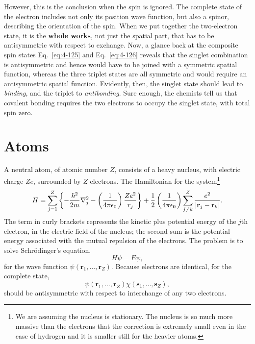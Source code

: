 However, this is the conclusion when the spin is ignored.
The complete state of the electron includes not only its position wave function, but also a spinor, describing the orientation of the spin.
When we put together the two-electron state, it is the \textbf{whole works}, not just the spatial part, that has to be antisymmetric with respect to exchange.
Now, a glance back at the composite spin states Eq.~\eqref{eq:4-125} and Eq.~\eqref{eq:4-126} reveals that the singlet combination is antisymmetric and hence would have to be joined with a symmetric spatial function, whereas the three triplet states are all symmetric and would require an antisymmetric spatial function.
Evidently, then, the singlet state should lead to \textit{binding}, and the triplet to \textit{antibonding}.
Sure enough, the chemists tell us that covalent bonding requires the two electrons to occupy the singlet state, with total spin zero.

\section{Atoms}
A neutral atom, of atomic number $Z$, consists of a heavy nucleus, with electric charge $Ze$, surrounded by $Z$ electrons.
The Hamiltonian for the system\footnote{We are assuming the nucleus is stationary. The nucleus is so much more massive than the electrons that the correction is extremely small even in the case of hydrogen and it is smaller still for the heavier atoms.}
\begin{equation}
  \label{eq:5-16}
 H = \sum_{j=1}^Z \left\{ - \frac{\hbar^{2}}{2m} \nabla^2_j - \left( \frac{1}{4\pi \epsilon_{0}} \right)  \frac{Z e^{2}}{r_{j}}\right\} + \frac{1}{2} \left( \frac{1}{4 \pi \epsilon_{0}} \right) \sum_{j \neq k}^Z \frac{e^{2}}{\abs{\mathbf{r}_j - \mathbf{r}_k}}.
\end{equation}
The term in curly brackets represents the kinetic plus potential energy of the $j$th electron, in the electric field of the nucleus; the second sum is the potential energy associated with the mutual repulsion of the electrons.
The problem is to solve Schr\"odinger's equation,
\begin{equation}
  \label{eq:5-17}
 H \psi = E \psi,
\end{equation}
for the wave function $\psi \left( \mathbf{r}_1, \ldots, \mathbf{r}_Z \right)$.
Because electrons are identical, for the complete state,
\begin{equation}
  \label{eq:5-18}
  \psi \left( \mathbf{r}_1, \ldots, \mathbf{r}_Z \right) \chi \left( \mathbf{s}_1, \ldots, \mathbf{s}_{Z} \right),
\end{equation}
should be antisymmetric with respect to interchange of any two electrons.

